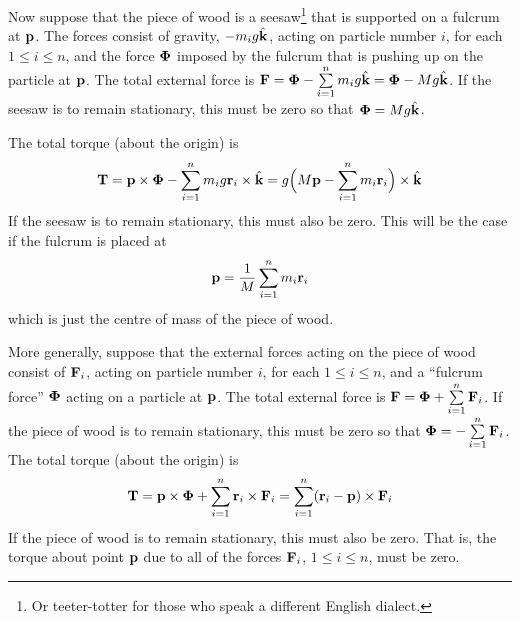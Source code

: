 Now suppose that the piece of wood is a seesaw\footnote{Or teeter-totter
for those who speak a different English dialect.} that is supported on a 
fulcrum at $\mathbf{p}$. The forces consist of gravity, $-m_ig\hat{\mathbf{k}}$,
acting on particle number $i$, for each  $1\le i\le n$, and the%
force $\mathbf{\Phi}$ imposed by the fulcrum that is pushing up on the particle 
at $\mathbf{p}$. The total external force is $\mathbf{F}=\mathbf{\Phi}-\sum\limits_{i=1}^n m_ig\hat{\mathbf{k}}
=\mathbf{\Phi}-Mg\hat{\mathbf{k}}$. If the seesaw is to remain stationary, this must be zero so that
$\mathbf{\Phi}=Mg\hat{\mathbf{k}}$. 

The total torque (about the origin) is 
\begin{equation*}
\mathbf{T}=\mathbf{p}\times\mathbf{\Phi}-\sum_{i=1}^n m_ig \mathbf{r}_i\times\hat{\mathbf{k}}
=g\Big(M\mathbf{p}-\sum_{i=1}^n m_i \mathbf{r}_i\Big)\times\hat{\mathbf{k}}
\end{equation*}
If the seesaw is to remain stationary, this must also be zero. This will
be the case if the fulcrum is placed at
\begin{equation*}
\mathbf{p}=\frac{1}{M}\sum_{i=1}^n m_i \mathbf{r}_i
\end{equation*}
which is just the centre of mass of the piece of wood.

More generally, suppose that the external forces acting on the piece of wood
consist of $\mathbf{F}_i$, acting on particle number $i$, for each $1\le i\le n$, 
and a ``fulcrum force'' $\mathbf{\Phi}$ acting on a particle at 
$\mathbf{p}$. The total external force is $\mathbf{F}=\mathbf{\Phi}+\sum\limits_{i=1}^n \mathbf{F}_i$. 
If the piece of wood is to remain stationary, this must be zero so that
$\mathbf{\Phi}=-\sum\limits_{i=1}^n \mathbf{F}_i$. The total torque (about the origin) is 
\begin{equation*}
\mathbf{T}=\mathbf{p}\times\mathbf{\Phi}+\sum_{i=1}^n \mathbf{r}_i\times\mathbf{F}_i
=\sum_{i=1}^n (\mathbf{r}_i-\mathbf{p})\times\mathbf{F}_i
\end{equation*}
If the piece of wood is to remain stationary, this must also be zero. 
That is, the torque about point $\mathbf{p}$ due to all of the forces $\mathbf{F}_i$,
$1\le i\le n$, must be zero.




